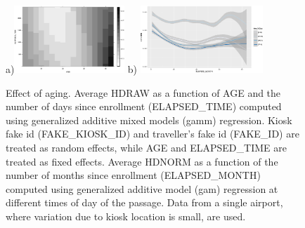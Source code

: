 \documentclass{cta-author}%
\begin{document}
\begin{figure} [!b] 
\centering
a)\includegraphics[width=0.5\linewidth,height=1in]{eps/HDNORMvsAGE-ELAPSED(inverted).eps}  
b)
\includegraphics[width=0.45\linewidth,height=1in]{eps/HDNORM=F(ELAPSE,hh)-PORT=A.eps} 

\caption{Effect of aging. 
 { 
Average HDRAW as a function of AGE and the number of days since enrollment (ELAPSED\_TIME) computed using generalized additive mixed models (gamm) regression.  
Kiosk fake id (FAKE\_KIOSK\_ID) and traveller's fake id (FAKE\_ID) are treated as random effects, while AGE and ELAPSED\_TIME are treated as fixed effects.
}
 {  Average HDNORM as a function of the number of months since enrollment (ELAPSED\_MONTH) computed  using generalized additive model (gam) regression  at different times of day of the passage. Data from a single airport, where variation due to kiosk location is small, are used.
}
\label{fAgingHH}}
\end{figure}
\end{document}
